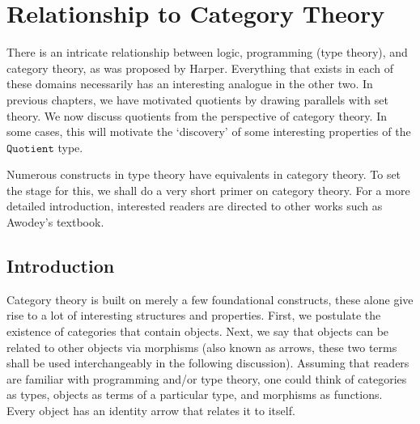 \documentclass[12pt,twoside,maitrise]{dms}
\theoremstyle{definition}
\numberwithin{equation}{section}
\numberwithin{table}{chapter}
\numberwithin{figure}{chapter}
\newcommand\id[1] {\texttt{#1}}
\begin{document}
\chapter{Relationship to Category Theory}
There is an intricate relationship between logic, programming (type theory), and
category theory, as was proposed by Harper\cite{harpertrinity}. Everything that
exists in each of these domains necessarily has an interesting analogue in the
other two. In previous chapters, we have motivated quotients by drawing
parallels with set theory. We now discuss quotients from the perspective of
category theory. In some cases, this will motivate the `discovery' of some
interesting properties of the $\id{Quotient}$ type.


Numerous constructs in type theory have equivalents in category theory. To set
the stage for this, we shall do a very short primer on category theory. For a
more detailed introduction, interested readers are directed to other works such
as Awodey's textbook\cite{awodey-cattheory}.

\section{Introduction}
Category theory is built on merely a few foundational constructs, these alone
give rise to a lot of interesting structures and properties. First, we postulate
the existence of categories that contain objects. Next, we say that objects can
be related to other objects via morphisms (also known as arrows, these two terms
shall be used interchangeably in the following discussion). Assuming that
readers are familiar with programming and/or type theory, one could think of
categories as types, objects as terms of a particular type, and morphisms as
functions. Every object has an identity arrow that relates it to itself.
\end{document}

